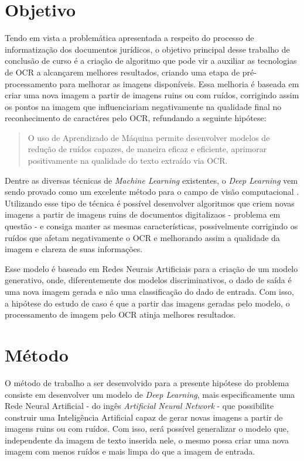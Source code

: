 \newpage

\section{Objetivo}

Tendo em vista a problemática apresentada a respeito do processo de informatização dos documentos jurídicos, o objetivo principal desse trabalho de conclusão de curso é a criação de algoritmo que pode vir a auxiliar as tecnologias de OCR a alcançarem melhores resultados, criando uma etapa de pré-processamento para melhorar as imagens disponíveis. Essa melhoria é baseada em criar uma nova imagem a partir de imagens ruins ou com ruídos, corrigindo assim os pontos na imagem que influenciariam negativamente na qualidade final no reconhecimento de caractéres pelo OCR, refundando a seguinte hipótese:

\begin{quote}
  O uso de Aprendizado de Máquina permite desenvolver modelos de redução de ruídos capazes, de maneira eficaz e eficiente, aprimorar positivamente na qualidade do texto extraído via OCR.
\end{quote}

Dentre as diversas técnicas de \textit{Machine Learning} existentes, o \textit{Deep Learning} vem sendo provado como um excelente método para o campo de visão computacional \cite{dl-brief-review}. Utilizando esse tipo de técnica é possível desenvolver algoritmos que criem novas imagens a partir de imagens ruins de documentos digitalizaos - problema em questão - e consiga manter as mesmas características, possivelmente corrigindo os ruídos que afetam negativamente o OCR e melhorando assim a qualidade da imagem e clareza de suas informações.

Esse modelo é baseado em Redes Neurais Artificiais para a criação de um modelo generativo, onde, diferentemente dos modelos discriminativos, o dado de saída é uma nova imagem gerada e não uma classificação do dado de entrada. Com isso, a hipótese do estudo de caso é que a partir das imagens geradas pelo modelo, o processamento de imagem pelo OCR atinja melhores resultados.

\section{Método}

O método de trabalho a ser desenvolvido para a presente hipótese do problema consiste em desenvolver um modelo de \textit{Deep Learning}, mais especificamente uma Rede Neural Artificial - do ingês \textit{Artificial Neural Network} - que possibilite construir uma Inteligência Artificial capaz de gerar novas imagens a partir de imagens ruins ou com ruídos. Com isso, será possível generalizar o modelo que, independente da imagem de texto inserida nele, o mesmo possa criar uma nova imagem com menos ruídos e mais limpa do que a imagem de entrada.

